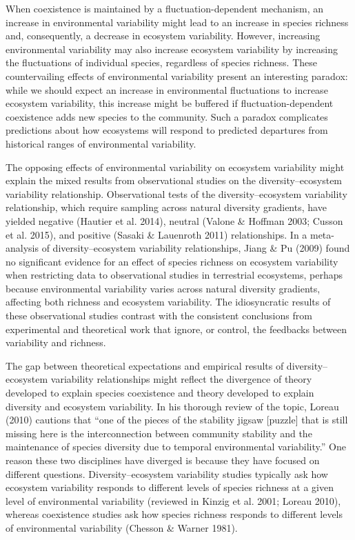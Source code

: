 \documentclass[12pt,]{article}
\begin{document}
When coexistence is maintained by a fluctuation-dependent mechanism, an
increase in environmental variability might lead to an increase in
species richness and, consequently, a decrease in ecosystem variability.
However, increasing environmental variability may also increase
ecosystem variability by increasing the fluctuations of individual
species, regardless of species richness. These countervailing effects of
environmental variability present an interesting paradox: while we
should expect an increase in environmental fluctuations to increase
ecosystem variability, this increase might be buffered if
fluctuation-dependent coexistence adds new species to the community.
Such a paradox complicates predictions about how ecosystems will respond
to predicted departures from historical ranges of environmental
variability.

The opposing effects of environmental variability on ecosystem
variability might explain the mixed results from observational studies
on the diversity--ecosystem variability relationship. Observational
tests of the diversity--ecosystem variability relationship, which
require sampling across natural diversity gradients, have yielded
negative (Hautier et al. 2014), neutral (Valone \& Hoffman 2003; Cusson
et al. 2015), and positive (Sasaki \& Lauenroth 2011) relationships. In
a meta-analysis of diversity--ecosystem variability relationships, Jiang
\& Pu (2009) found no significant evidence for an effect of species
richness on ecosystem variability when restricting data to observational
studies in terrestrial ecosystems, perhaps because environmental
variability varies across natural diversity gradients, affecting both
richness and ecosystem variability. The idiosyncratic results of these
observational studies contrast with the consistent conclusions from
experimental and theoretical work that ignore, or control, the feedbacks
between variability and richness.

The gap between theoretical expectations and empirical results of
diversity--ecosystem variability relationships might reflect the
divergence of theory developed to explain species coexistence and theory
developed to explain diversity and ecosystem variability. In his
thorough review of the topic, Loreau (2010) cautions that ``one of the
pieces of the stability jigsaw {[}puzzle{]} that is still missing here
is the interconnection between community stability and the maintenance
of species diversity due to temporal environmental variability.'' One
reason these two disciplines have diverged is because they have focused
on different questions. Diversity--ecosystem variability studies
typically ask how ecosystem variability responds to different levels of
species richness at a given level of environmental variability (reviewed
in Kinzig et al. 2001; Loreau 2010), whereas coexistence studies ask how
species richness responds to different levels of environmental
variability (Chesson \& Warner 1981).
\end{document}
